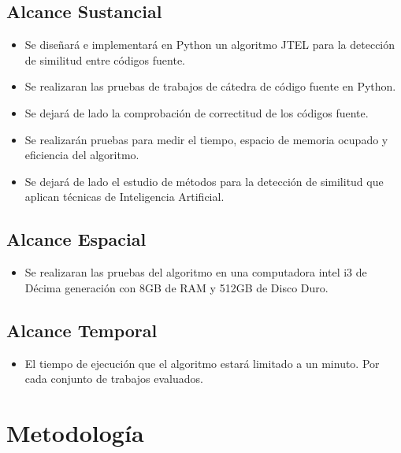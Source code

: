 \subsection{Alcance Sustancial}
\begin{itemize}
    \item Se diseñará e implementará en Python un algoritmo JTEL para la detección de similitud entre códigos fuente.
    \item Se realizaran las pruebas de trabajos de cátedra de código fuente en Python.
    \item Se dejará de lado la comprobación de correctitud de los códigos fuente.
    \item Se realizarán pruebas para medir el tiempo, espacio de memoria ocupado y eficiencia del algoritmo.
    \item Se dejará de lado el estudio de métodos para la detección de similitud que aplican técnicas de Inteligencia Artificial.
\end{itemize}
\subsection{Alcance Espacial}
\begin{itemize}
    \item Se realizaran las pruebas del algoritmo en una computadora intel i3 de Décima generación con 8GB de RAM y 512GB de Disco Duro.
\end{itemize}
\subsection{Alcance Temporal}
\begin{itemize}
    \item El tiempo de ejecución que el algoritmo estará limitado a un minuto. Por cada conjunto de trabajos evaluados.
\end{itemize}
\section{Metodología}
